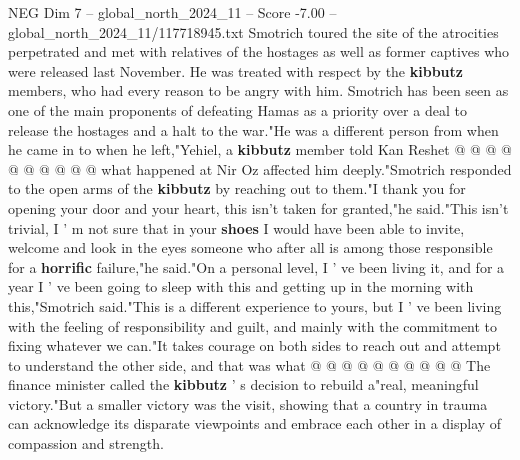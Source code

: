 \begin{textsample}{NEG Dim 7 – global\_north\_2024\_11 – Score -7.00 – global\_north\_2024\_11/117718945.txt}
Smotrich toured the site of the atrocities perpetrated and met with relatives of the hostages as well as former captives who were released last November.
He was treated with respect by the \textbf{kibbutz} members, who had every reason to be angry with him.
Smotrich has been seen as one of the main proponents of defeating Hamas as a priority over a deal to release the hostages and a halt to the war."He was a different person from when he came in to when he left,"Yehiel, a \textbf{kibbutz} member told Kan Reshet @ @ @ @ @ @ @ @ @ @ what happened at Nir Oz affected him deeply."Smotrich responded to the open arms of the \textbf{kibbutz} by reaching out to them."I thank you for opening your door and your heart, this isn't taken for granted,"he said."This isn't trivial, I ' m not sure that in your \textbf{shoes} I would have been able to invite, welcome and look in the eyes someone who after all is among those responsible for a \textbf{horrific} failure,"he said."On a personal level, I ' ve been living it, and for a year I ' ve been going to sleep with this and getting up in the morning with this,"Smotrich said."This is a different experience to yours, but I ' ve been living with the feeling of responsibility and guilt, and mainly with the commitment to fixing whatever we can."It takes courage on both sides to reach out and attempt to understand the other side, and that was what @ @ @ @ @ @ @ @ @ @ The finance minister called the \textbf{kibbutz} ' s decision to rebuild a"real, meaningful victory."But a smaller victory was the visit, showing that a country in trauma can acknowledge its disparate viewpoints and embrace each other in a display of compassion and strength.

\end{textsample}
